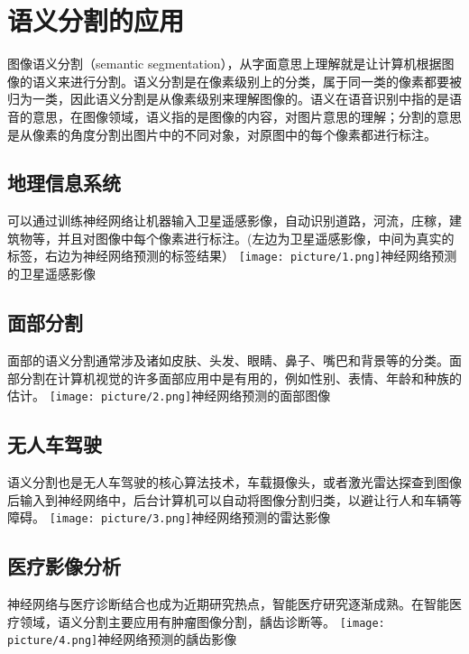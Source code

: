 
\chapter{语义分割的应用}

图像语义分割（semantic
segmentation），从字面意思上理解就是让计算机根据图像的语义来进行分割。语义分割是在像素级别上的分类，属于同一类的像素都要被归为一类，因此语义分割是从像素级别来理解图像的。语义在语音识别中指的是语音的意思，在图像领域，语义指的是图像的内容，对图片意思的理解；分割的意思是从像素的角度分割出图片中的不同对象，对原图中的每个像素都进行标注。

\section{地理信息系统}

可以通过训练神经网络让机器输入卫星遥感影像，自动识别道路，河流，庄稼，建筑物等，并且对图像中每个像素进行标注。(左边为卫星遥感影像，中间为真实的标签，右边为神经网络预测的标签结果）
\texttt{[image: picture/1.png]}神经网络预测的卫星遥感影像

\section{面部分割}

面部的语义分割通常涉及诸如皮肤、头发、眼睛、鼻子、嘴巴和背景等的分类。面部分割在计算机视觉的许多面部应用中是有用的，例如性别、表情、年龄和种族的估计。
\texttt{[image: picture/2.png]}神经网络预测的面部图像

\section{无人车驾驶}

语义分割也是无人车驾驶的核心算法技术，车载摄像头，或者激光雷达探查到图像后输入到神经网络中，后台计算机可以自动将图像分割归类，以避让行人和车辆等障碍。
\texttt{[image: picture/3.png]}神经网络预测的雷达影像

\section{医疗影像分析}

神经网络与医疗诊断结合也成为近期研究热点，智能医疗研究逐渐成熟。在智能医疗领域，语义分割主要应用有肿瘤图像分割，龋齿诊断等。
\texttt{[image: picture/4.png]}神经网络预测的龋齿影像
